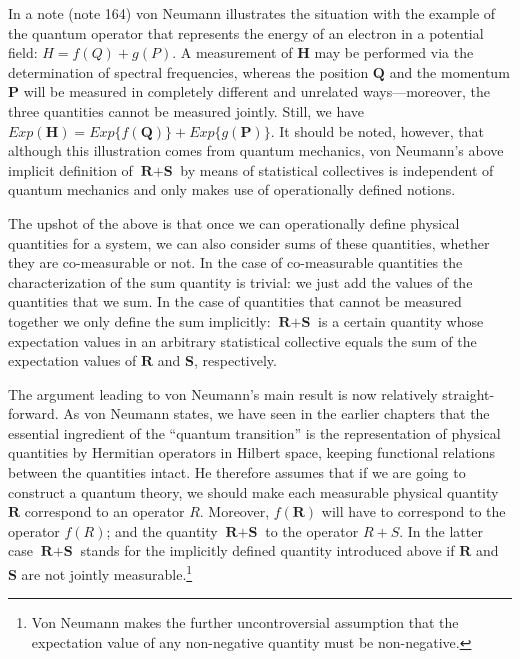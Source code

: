 \documentclass[11pt]{article}
\begin{document}
In a note (note 164) von Neumann illustrates the situation with the example of the quantum operator that represents the energy of an electron in a potential field: $H = f(Q) + g(P)$. A measurement of $\textbf{H}$ may be performed via the determination of spectral frequencies, whereas the position $\textbf{Q}$ and the momentum $\textbf{P}$ will be measured in completely different and unrelated ways---moreover, the three quantities cannot be measured jointly. Still, we have $Exp(\textbf{H}) = Exp\{f(\textbf{Q})\} + Exp\{g(\textbf{P})\}$. It should be noted, however, that although this illustration comes from quantum mechanics, von Neumann's above implicit definition of $\textbf{R} + \textbf{S}$ by means of statistical collectives is independent of quantum mechanics and only makes use of operationally defined notions.

The upshot of the above is that once we can operationally define physical quantities for a system, we can also consider sums of these quantities, whether they are co-measurable or not. In the case of co-measurable quantities the characterization of the sum quantity is trivial: we just add the values of the quantities that we sum. In the case of quantities that cannot be measured together we only define the sum implicitly: $\textbf{R} + \textbf{S}$ is a certain quantity whose expectation values in an arbitrary statistical collective equals the sum of the expectation values of $\textbf{R}$ and $\textbf{S}$, respectively.

The argument leading to von Neumann's main result is now relatively straight-forward. As von Neumann states, we have seen in the earlier chapters that the essential ingredient of the ``quantum transition'' is the representation of physical quantities by Hermitian operators in Hilbert space, keeping functional relations between the quantities intact. He therefore assumes that if we are going to construct a quantum theory, we should make each measurable physical quantity $\textbf{R}$ correspond to an operator $R$. Moreover, $f(\textbf{R})$ will have to correspond to the operator $f(R)$; and the quantity $\textbf{R} + \textbf{S}$ to the operator $R + S$. In the latter case $\textbf{R} + \textbf{S}$ stands for the implicitly defined quantity introduced above if $\textbf{R}$ and $\textbf{S}$ are not jointly measurable.\footnote{Von Neumann makes the further uncontroversial assumption that the expectation value of any non-negative quantity must be non-negative.}
\end{document}
